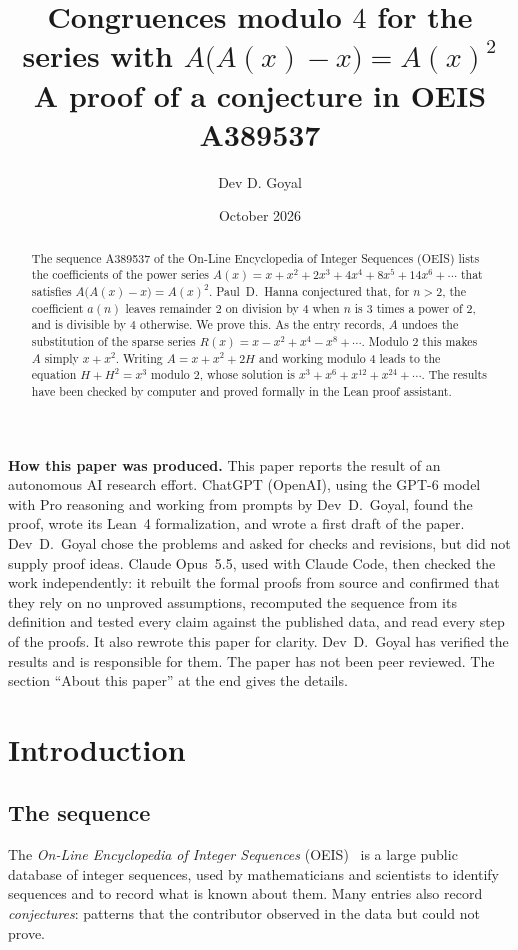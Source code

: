 \documentclass[11pt,a4paper]{article}
\title{Congruences modulo $4$ for the series with $A\bigl(A(x)-x\bigr)=A(x)^2$\\[6pt]\large A proof of a conjecture in OEIS A389537}
\author{Dev D. Goyal}
\date{October 2026}
\theoremstyle{definition}
\theoremstyle{remark}
\begin{document}
\maketitle
\begin{abstract}
The sequence A389537 of the On-Line Encyclopedia of Integer Sequences (OEIS) lists the coefficients of the power series
$A(x)=x+x^2+2x^3+4x^4+8x^5+14x^6+\cdots$ that satisfies $A\bigl(A(x)-x\bigr)=A(x)^2$. Paul~D.~Hanna conjectured that,
for $n>2$, the coefficient $a(n)$ leaves remainder $2$ on division by $4$ when $n$ is $3$ times a power of $2$, and is
divisible by $4$ otherwise. We prove this. As the entry records, $A$ undoes the substitution of the sparse series
$R(x)=x-x^2+x^4-x^8+\cdots$. Modulo $2$ this makes $A$ simply $x+x^2$. Writing $A=x+x^2+2H$ and working modulo $4$
leads to the equation $H+H^2=x^3$ modulo $2$, whose solution is $x^3+x^6+x^{12}+x^{24}+\cdots$. The results have been
checked by computer and proved formally in the Lean proof assistant.
\end{abstract}
\begin{center}\begin{minipage}{0.88\linewidth}\small
\textbf{How this paper was produced.} This paper reports the result of an autonomous AI research effort.
ChatGPT (OpenAI), using the GPT-6 model with Pro reasoning and working from prompts by Dev~D.~Goyal, found the proof, wrote its Lean~4 formalization, and wrote a first draft of the paper.
Dev~D.~Goyal chose the problems and asked for checks and revisions, but did not supply proof ideas.
Claude Opus~5.5, used with Claude Code, then checked the work independently: it rebuilt the formal proofs from
source and confirmed that they rely on no unproved assumptions, recomputed the sequence from its definition and tested
every claim against the published data, and read every step of the proofs. It also rewrote this paper for clarity.
Dev~D.~Goyal has verified the results and is responsible for them. The paper has not been peer reviewed.
The section ``About this paper'' at the end gives the details.
\end{minipage}\end{center}

\section{Introduction}

\subsection{The sequence}\label{sec:sequence}
The \emph{On-Line Encyclopedia of Integer Sequences} (OEIS)~\cite{oeisdb} is a large public database of integer
sequences, used by mathematicians and scientists to identify sequences and to record what is known about them. Many
entries also record \emph{conjectures}: patterns that the contributor observed in the data but could not prove.
\end{document}
